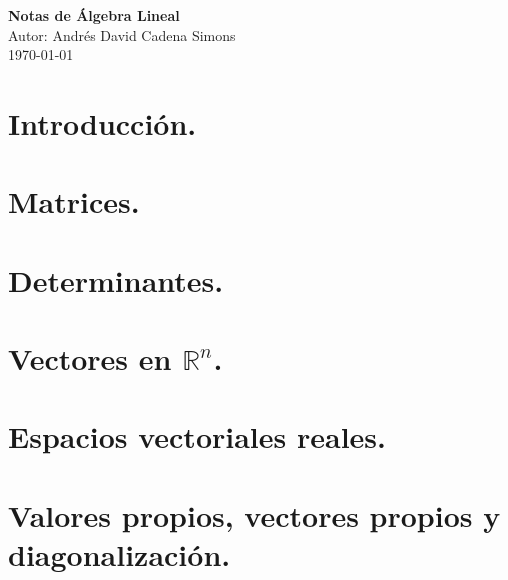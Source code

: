 \documentclass[a4paper,12pt]{book}
\begin{document}
\begin{titlepage}
    \centering
    {\Huge \textbf{Notas de Álgebra Lineal}}\\[2cm]
    {\Large Autor: Andrés David Cadena Simons}\\[1cm]
    {\Large \today}
\end{titlepage}

\chapter*{Introducción.}


\tableofcontents

\chapter{Matrices.}

\chapter{Determinantes.}
\chapter{Vectores en $\mathbb{R}^{n}$.}
\chapter{Espacios vectoriales reales.}
\chapter{Valores propios, vectores propios y diagonalización.}



  
\end{document}
